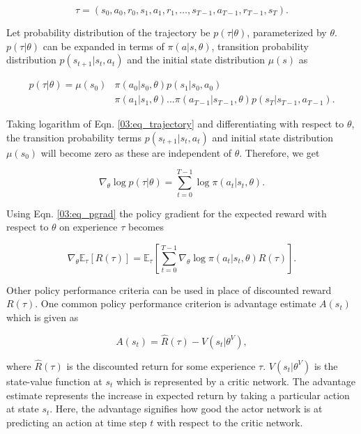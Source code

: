 \begin{equation}
\nonumber
\tau = (s_0, a_0, r_0, s_1, a_1, r_1, \dots, s_{T-1}, a_{T-1}, r_{T-1}, s_{T}).
\end{equation}

Let probability distribution of the trajectory be $p(\tau|\theta)$, parameterized by $\theta$. $p(\tau|\theta)$ can be expanded in terms of $\pi(a|s,\theta)$, transition probability distribution $p(s_{t+1}| s_t, a_t)$ and the initial state distribution $\mu(s)$ as

\begin{align} \label{03:eq_trajectory}
\nonumber
p(\tau|\theta) = \mu(s_0) & \pi(a_0|s_0, \theta) p(s_1|s_0, a_0) \\& \pi(a_1|s_1, \theta) \dots \pi(a_{T-1}|s_{T-1}, \theta) p(s_T|s_{T-1},a_{T-1}).
\end{align}

Taking logarithm of Eqn. \ref{03:eq_trajectory} and differentiating with respect to $\theta$, the transition probability terms $p(s_{t+1}| s_t, a_t)$ and initial state distribution $\mu(s_0)$ will become zero as these are independent of $\theta$. Therefore, we get

\begin{equation}
\nonumber
\nabla_\theta \log p(\tau|\theta) = \sum_{t=0}^{T-1}\log \pi(a_t|s_t,\theta).
\end{equation}

Using Eqn. \ref{03:eq_pgrad} the policy gradient for the expected reward with respect to $\theta$ on experience $\tau$ becomes 

\begin{equation}\label{03:eq_policygradient}
\nabla_\theta \mathbb{E}_\tau[R(\tau)] = \mathbb{E}_\tau \left [ \sum_{t=0}^{T-1} \nabla_\theta \log \pi(a_t| s_t, \theta) R(\tau) \right].
\end{equation}

Other policy performance criteria can be used in place of discounted reward $R(\tau)$. One common policy performance criterion is advantage estimate $A(s_t)$ which is given as

\begin{equation} \label{03:eq_adv}
A(s_t) = \hat{R}(\tau) - V(s_t|\theta^V),
\end{equation}

where $\hat{R}(\tau)$ is the discounted return for some experience $\tau$. $V(s_t|\theta^V)$ is the state-value function at $s_t$ which is represented by a critic network. The advantage estimate represents the increase in expected return by taking a particular action at state $s_t$. Here, the advantage signifies how good the actor network is at predicting an action at time step $t$ with respect to the critic network.

